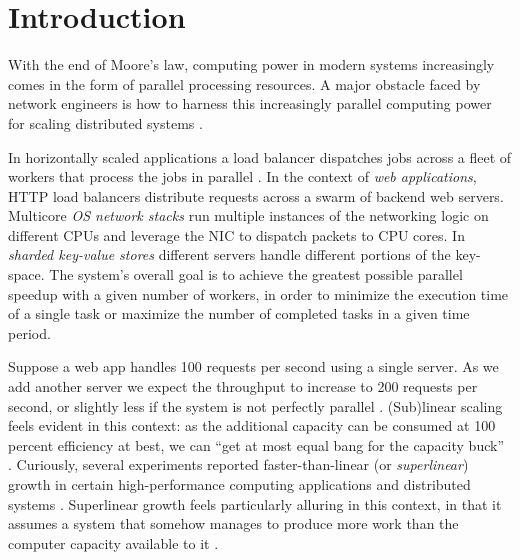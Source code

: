 \section{Introduction}\label{sec:introduction}

With the end of Moore's law, computing power in modern systems increasingly comes in the form of parallel processing resources.  A major obstacle faced by network engineers is how to harness this increasingly parallel computing power for scaling distributed systems \cite{265065, 10.5555/3307441.3307467, 10.1145/2815400.2815423, 10.1145/3098822.3098826, 10.5555/3154630.3154639}.

In horizontally scaled applications a load balancer dispatches jobs across a fleet of workers that process the jobs in parallel \cite{10.5555/3235491}.  In the context of \emph{web applications}, HTTP load balancers \cite{194966, 211279, 9552525} distribute requests across a swarm of backend web servers.  %
Multicore \emph{OS network stacks} \cite{211263, 10.1145/3359989.3365412, 10.1145/3452296.3472914} run multiple instances of the networking logic on different CPUs and leverage the NIC to dispatch packets to CPU cores. %
In \emph{sharded key-value stores} \cite{ghigoff2021bmc} different servers handle different portions of the key-space.  The system's overall goal is to achieve the greatest possible parallel speedup with a given number of workers, in order to minimize the execution time of a single task or maximize the number of completed tasks in a given time period.

Suppose a web app handles 100 requests per second using a single server. As we add another server we expect the throughput to increase to 200 requests per second, or slightly less if the system is not perfectly parallel \cite{10.1145/1465482.1465560}. (Sub)linear scaling feels evident in this context: as the additional capacity can be consumed at 100 percent efficiency at best, we can ``get at most equal bang for the capacity buck'' \cite{10.1145/2773212.2789974}. Curiously, several experiments reported faster-than-linear (or \emph{superlinear}) growth in certain high-performance computing applications and distributed systems \cite{scalability-analyzed, 10.5555/1012889.1012894, 271208, icsoft20, sdn-analytitcs, 556383, 6483679, 10.1007/978-3-319-77610-1, dobb-1, dobb-2, 10.1145/3627703.3629574, 7733347, 80148}.  Superlinear growth feels particularly alluring in this context, in that it assumes a system that somehow manages to produce more work than the computer capacity available to it \cite{10.1145/2773212.2789974}.

